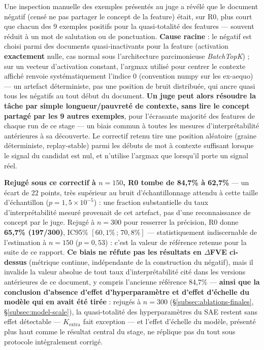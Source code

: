 \documentclass[11pt]{article}
\begin{document}
\begin{resultbox}
Une inspection manuelle des exemples présentés au juge a révélé que le
document \og{}négatif\fg{} (censé ne pas partager le concept de la feature)
était, sur R0, plus court que chacun des 9 exemples positifs pour la
quasi-totalité des features --- souvent réduit à un mot de salutation ou de
ponctuation. \textbf{Cause racine} : le négatif est choisi parmi des
documents quasi-inactivants pour la feature (activation \textbf{exactement}
nulle, cas normal sous l'architecture parcimonieuse \emph{BatchTopK}) ; sur
un vecteur d'activation constant, l'argmax utilisé pour centrer le contexte
affiché renvoie systématiquement l'indice 0 (convention numpy sur les
ex-aequo) --- un artefact déterministe, pas une position de bruit distribuée,
qui ancre quasi tous les négatifs au tout début du document. \textbf{Un juge
peut alors résoudre la tâche par simple longueur/pauvreté de contexte, sans
lire le concept partagé par les 9 autres exemples}, pour l'écrasante majorité
des features de chaque run de ce stage --- un biais commun à toutes les
mesures d'interprétabilité antérieures à sa découverte. Le correctif retenu
tire une position aléatoire (graine déterministe, replay-stable) parmi les
débuts de mot à contexte suffisant lorsque le signal du candidat est nul, et
n'utilise l'argmax que lorsqu'il porte un signal réel.

\textbf{Rejugé sous ce correctif à $n=150$, R0 tombe de 84,7\% à 62,7\%} ---
un écart de 22 points, très supérieur au bruit d'échantillonnage attendu à
cette taille d'échantillon ($p=1{,}5\times10^{-5}$) : une fraction
substantielle du taux d'interprétabilité mesuré provenait de cet artefact,
pas d'une reconnaissance de concept par le juge. Rejugé à $n=300$ pour
resserrer la précision, R0 donne \textbf{65,7\% (197/300)}, IC95\%
$[60{,}1\%\,;\,70{,}8\%]$ --- statistiquement indiscernable de l'estimation à
$n=150$ ($p=0{,}53$) : c'est la valeur de référence retenue pour la suite de
ce rapport. \textbf{Ce biais ne réfute pas les résultats en $\Delta$FVE
ci-dessus} (métrique continue, indépendante de la construction du négatif),
mais il invalide la valeur absolue de tout taux d'interprétabilité cité dans
les versions antérieures de ce document, y compris l'ancienne référence
84,7\% --- \textbf{ainsi que la conclusion d'absence d'effet d'hyperparamètre
et d'effet d'échelle du modèle qui en avait été tirée} : rejugés à $n=300$
(\S\ref{subsec:ablations-finales}, \S\ref{subsec:model-scale}), la
quasi-totalité des hyperparamètres du SAE restent sans effet détectable ---
$K_\text{extra}$ fait exception --- et l'effet d'échelle du modèle, présenté
plus haut comme le résultat central du stage, ne réplique pas du tout sous
protocole intégralement corrigé.
\end{resultbox}
\end{document}
